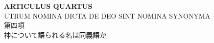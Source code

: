 \documentclass[10pt]{jsarticle}
\begin{document}
%
%

\newpage
{}

\begin{center}
{\Large {\bf ARTICULUS QUARTUS}}\\
{\large UTRUM NOMINA DICTA DE DEO SINT NOMINA SYNONYMA\\
第四項\\
神について語られる名は同義語か}
\end{center}
\end{document}
